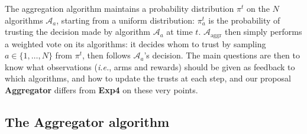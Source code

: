 \documentclass[conference]{IEEEtran}
\theoremstyle{plain}  %
\newcommand{\ie}{\emph{i.e.}}
\newcommand{\Aggr}[0]{\textbf{Aggregator}}
\newcommand{\ExpQ}[0]{\textbf{Exp4}}
\newcommand{\Alg}[0]{\mathcal{A}}
\begin{document}
The aggregation algorithm maintains a probability distribution $\pi^{t}$ on the $N$ algorithms $\Alg_a$, starting from a uniform distribution:
$\pi^t_a$ is the probability of trusting the decision made by algorithm $\Alg_a$ at time $t$.
$\Alg_{\mathrm{aggr}}$ then simply performs a weighted vote on its algorithms: it decides whom to trust by sampling $a \in \{1,\dots,N\}$ from $\pi^t$, then follows $\Alg_a$'s decision.
The main questions are then to know what observations (\ie, arms and rewards) should be given as feedback to which algorithms,
and how to update the trusts at each step, and our proposal \Aggr{} differs from \ExpQ{} on these very points.


\subsection{The \Aggr{} algorithm}\label{sub:Aggr}
\end{document}
